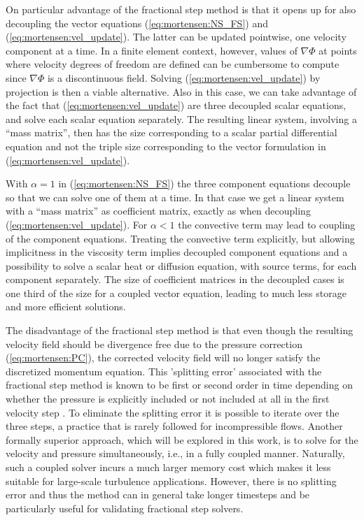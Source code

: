 On particular advantage of the fractional step method is that it opens
up for also decoupling the vector equations (\eqref{eq:mortensen:NS_FS})
and (\eqref{eq:mortensen:vel_update}). The latter can be updated pointwise,
one velocity component at a time. In a finite element context, however,
values of $\nabla\Phi$ at points where velocity degrees of freedom
are defined can be cumbersome to compute since $\nabla\Phi$ is
a discontinuous field. Solving (\eqref{eq:mortensen:vel_update}) by projection
is then a viable alternative. Also in this case, we can take advantage
of the fact that (\eqref{eq:mortensen:vel_update}) are three decoupled
scalar equations, and solve each scalar equation separately.
The resulting linear system, involving a ``mass matrix'', then has the size 
corresponding to a scalar partial differential equation and not the
triple size corresponding to the vector formulation in (\eqref{eq:mortensen:vel_update}).

With $\alpha =1$ in (\eqref{eq:mortensen:NS_FS}) the three component equations
decouple so that we can solve one of them at a time. In that case
we get a linear system with a ``mass matrix'' as coefficient matrix,
exactly as when decoupling (\eqref{eq:mortensen:vel_update}).
For $\alpha <1$ the convective term may lead to coupling of the
component equations. Treating the convective term explicitly, but
allowing implicitness in the viscosity term implies decoupled
component equations and a possibility to solve a scalar heat or 
diffusion equation, with source terms, for each component separately.
The size of coefficient matrices in the decoupled cases is one third
of the size for a coupled vector equation, leading to much less
storage and more efficient solutions.


The disadvantage of the fractional step method is
that even though the resulting velocity field should be divergence
free due to the pressure correction (\eqref{eq:mortensen:PC}), 
the corrected velocity field will
no longer satisfy the discretized momentum equation. This 'splitting
error' associated with the fractional step method is known to be first
or second order in time depending on whether the pressure is
explicitly included or not included at all in the first velocity
step \cite{GuermondMinevShen2006}. To eliminate the splitting error it is possible to iterate over
the three steps, a practice that is rarely followed for incompressible
flows. Another formally superior approach, which will be explored in
this work, is to solve for the velocity and pressure
simultaneously, i.e., in a fully coupled manner. 
Naturally, such a coupled solver incurs a much larger
memory cost which makes it  less suitable for large-scale turbulence
applications. However, there is no splitting error and thus the method
can in general take longer timesteps and be particularly useful for
validating fractional step solvers.

